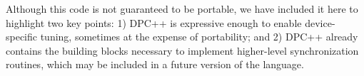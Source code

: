 Although this code is not guaranteed to be portable, we have included it here to highlight two key points: 1) DPC++ is expressive enough to enable device-specific tuning, sometimes at the expense of portability; and 2) DPC++ already contains the building blocks necessary to implement higher-level synchronization routines, which may be included in a future version of the language.\par










































